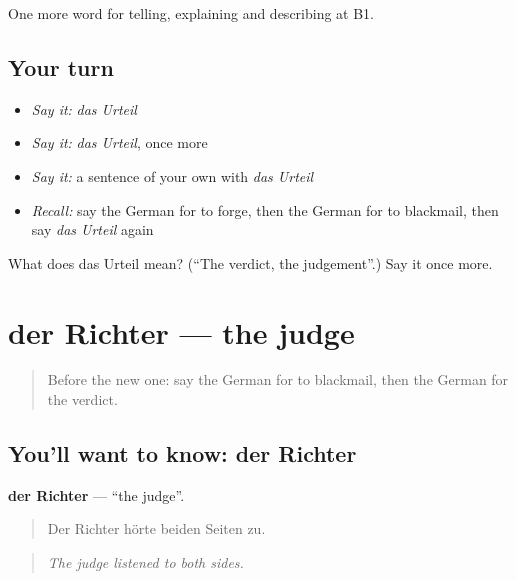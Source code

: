 \begin{grammarlens}[title={What you've built}]
One more word for telling, explaining and describing at B1.
\end{grammarlens}

\subsection*{Your turn}
\begin{itemize}
\raggedright
  \item \emph{Say it:} \emph{das Urteil}
  \item \emph{Say it:} \emph{das Urteil}, once more
  \item \emph{Say it:} a sentence of your own with \emph{das Urteil}
  \item \emph{Recall:} say the German for to forge, then the German for to blackmail, then say \emph{das Urteil} again
\end{itemize}

\begin{tcolorbox}[breakable,colback=teal!4,colframe=teal!35!black,title={Before you move on}]
What does das Urteil mean? (\textquotedblleft{}The verdict, the judgement\textquotedblright{}.) Say it once more.
\end{tcolorbox}
\section[der Richter]{der Richter — the judge}

\label{lesson:GE-C286-richter}



\begin{quote}
Before the new one: say the German for to blackmail, then the German for the verdict.
\end{quote}

\subsection*{You'll want to know: der Richter}
\textbf{der Richter} — \textquotedblleft{}the judge\textquotedblright{}.

\begin{quote}
Der Richter hörte beiden Seiten zu.
\end{quote}

\begin{quote}
\emph{The judge listened to both sides.}
\end{quote}

